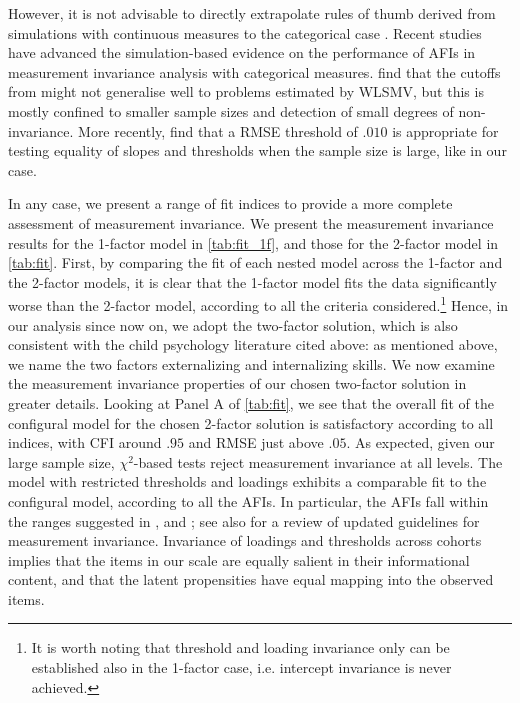 However, it is not advisable to directly extrapolate rules of thumb derived from simulations with continuous measures to the categorical case \citep{Lubke2004}. Recent studies have advanced the simulation-based evidence on the performance of AFIs in measurement invariance analysis with categorical measures. \citet{Sass2014} find that the cutoffs from \citet{Chen2007} might not generalise well to problems estimated by WLSMV, but this is mostly confined to smaller sample sizes and detection of small degrees of non-invariance. More recently, \citet{Rutkowski2017} find that a \textDelta RMSE threshold of $.010$ is appropriate for testing equality of slopes and thresholds when the sample size is large, like in our case. 

In any case, we present a range of fit indices to provide a more complete assessment of measurement invariance. We present the measurement invariance results for the 1-factor model in \autoref{tab:fit_1f}, and those for the 2-factor model in \autoref{tab:fit}. First, by comparing the fit of each nested model across the 1-factor and the 2-factor models, it is clear that the 1-factor model fits the data significantly worse than the 2-factor model, according to all the criteria considered.\footnote{It is  worth noting that threshold and loading invariance only can be established also in the 1-factor case, i.e. intercept invariance is never achieved.} Hence, in our analysis since now on, we adopt the two-factor solution, which is also consistent with the child psychology literature cited above: as mentioned above, we name the two factors externalizing and internalizing skills. We now examine the measurement invariance properties of our chosen two-factor solution in greater details. Looking at Panel A of \autoref{tab:fit}, we see that the overall fit of the configural model for the chosen 2-factor solution is satisfactory according to all indices, with CFI around $.95$ and RMSE just above $.05$. As expected, given our large sample size, $\chi^2$-based tests reject measurement invariance at all levels. The model with restricted thresholds and loadings exhibits a comparable fit to the configural model, according to all the AFIs. In particular, the \textDelta AFIs fall within the ranges suggested in \citet{Chen2007}, \citet{Rutkowski2017} and \citet{Svetina2017}; see also \citet{Svetina2019} for a review of updated guidelines for measurement invariance. Invariance of loadings and thresholds across cohorts implies that the items in our scale are equally salient in their informational content, and that the latent propensities have equal mapping into the observed items. 

